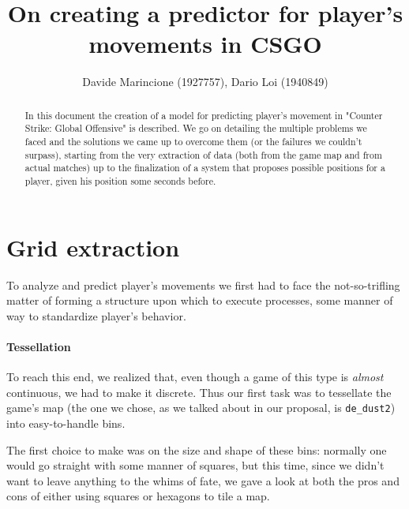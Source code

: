 \documentclass[9pt, a4paper]{IEEEtran}
\author{Davide Marincione (1927757), Dario Loi (1940849)}
\title{On creating a predictor for player's movements in CSGO}
\begin{document}
    \maketitle

    \begin{abstract}
        In this document the creation of a model for predicting player's movement in "Counter Strike: Global Offensive" is described. We go on detailing the multiple problems we faced and the solutions we came up to overcome them (or the failures we couldn't surpass), starting from the very extraction of data (both from the game map and from actual matches) up to the finalization of a system that proposes possible positions for a player, given his position some seconds before.
    \end{abstract}

    \section{Grid extraction}
    To analyze and predict player's movements we first had to face the not-so-trifling matter of forming a structure upon which to execute processes, some manner of way to standardize player's behavior.

    \paragraph*{Tessellation}
    To reach this end, we realized that, even though a game of this type is \emph{almost} continuous, we had to make it discrete. Thus our first task was to tessellate the game's map (the one we chose, as we talked about in our proposal, is \texttt{de\_dust2}) into easy-to-handle bins.

    The first choice to make was on the size and shape of these bins: normally one would go straight with some manner of squares, but this time, since we didn't want to leave anything to the whims of fate, we gave a look at both the pros and cons of either using squares or hexagons to tile a map.
\end{document}
